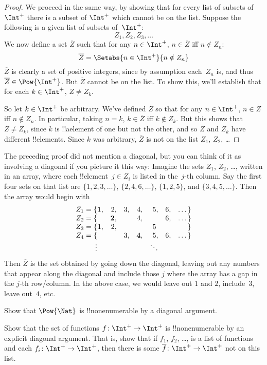 \documentclass[../../../include/open-logic-section]{subfiles}
\begin{document}
\begin{proof}
We proceed in the same way, by showing that for every list of subsets
of~$\Int^+$ there is a subset of $\Int^+$ which cannot be on the list.
Suppose the following is a given list of subsets of~$\Int^+$:
\[
Z_{1}, Z_{2}, Z_{3}, \dots
\]
We now define a set $\overline{Z}$ such that for any $n \in \Int^+$,
$n \in \overline{Z}$ iff $n \notin Z_{n}$:
\[
\overline{Z} = \Setabs{n \in \Int^+}{n \notin Z_n}
\]
$\overline{Z}$ is clearly a set of positive integers, since by
assumption each~$Z_n$ is, and thus $\overline{Z} \in
\Pow{\Int^+}$. But $\overline{Z}$ cannot be on the list.  To show
this, we'll establish that for each $k \in \Int^+$, $\overline{Z} \neq
Z_k$. 

So let $k \in \Int^+$ be arbitrary. We've defined $\overline{Z}$ so
that for any $n \in \Int^+$, $n \in \overline{Z}$ iff $n \notin Z_n$.
In particular, taking $n=k$, $k \in \overline{Z}$ iff $k \notin Z_k$.
But this shows that $\overline{Z} \neq Z_k$, since $k$ is !!a{element}
of one but not the other, and so $\overline{Z}$ and $Z_k$ have
different !!{element}s. Since $k$ was arbitrary, $\overline{Z}$ is not
on the list $Z_1$, $Z_2$, \dots
\end{proof}

\begin{explain}
The preceding proof did not mention a diagonal, but you can think of
it as involving a diagonal if you picture it this way: Imagine the
sets $Z_1$, $Z_2$, \dots, written in an array, where each
!!{element}~$j \in Z_i$ is listed in the~$j$-th column. Say the first
four sets on that list are $\{1,2,3,\dots\}$, $\{2, 4, 6, \dots\}$,
$\{1,2,5\}$, and $\{3,4,5,\dots\}$. Then the array would begin with
\[
\begin{array}{r@{}rrrrrrr}
  Z_1 = \{ & \mathbf{1}, & 2, & 3, & 4, & 5, & 6, & \dots\}\\
  Z_2 = \{ &  & \mathbf{2}, &  & 4, &  & 6, & \dots\}\\
  Z_3 = \{ & 1, & 2, &  &  & 5\phantom{,} &  & \}\\
  Z_4 = \{ &  &  & 3, & \mathbf{4}, & 5, & 6, & \dots\}\\
  \vdots & & & & & \ddots
\end{array}
\]
Then $\overline{Z}$ is the set obtained by going down the diagonal,
leaving out any numbers that appear along the diagonal and include
those $j$ where the array has a gap in the $j$-th row/column. In the
above case, we would leave out $1$ and $2$, include~$3$, leave
out~$4$, etc.
\end{explain}

\begin{prob}
Show that $\Pow{\Nat}$ is !!{nonenumerable} by a diagonal argument.
\end{prob}

\begin{prob}
Show that the set of functions $f \colon \Int^+ \to \Int^+$ is
!!{nonenumerable} by an explicit diagonal argument. That is, show that
if $f_1$, $f_2$, \dots, is a list of functions and each $f_i\colon
\Int^+ \to \Int^+$, then there is some $\overline{f}\colon \Int^+ \to
\Int^+$ not on this list.
\end{prob}
\end{document}
